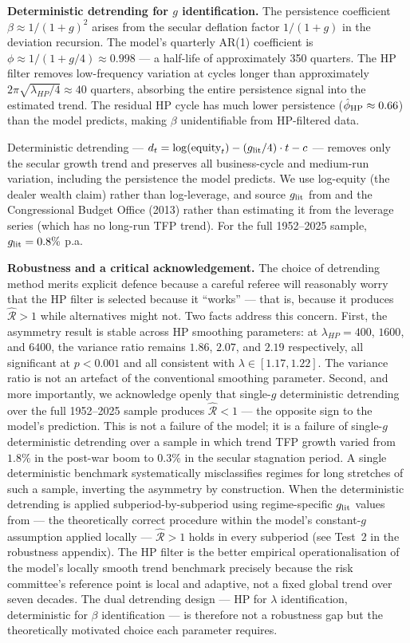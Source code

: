 \documentclass[12pt,a4paper]{article}
\theoremstyle{definition}
\begin{document}
\noindent\textbf{Deterministic detrending for $g$ identification.} The
persistence coefficient $\beta \approx 1/(1+g)^2$ arises from the
secular deflation factor $1/(1+g)$ in the deviation recursion. The
model's quarterly AR(1) coefficient is $\phi \approx 1/(1+g/4) \approx
0.998$ --- a half-life of approximately 350 quarters. The HP filter
removes low-frequency variation at cycles longer than approximately
$2\pi\sqrt{\lambda_{HP}/4} \approx 40$ quarters, absorbing the entire
persistence signal into the estimated trend. The residual HP cycle has
much lower persistence ($\hat{\phi}_{\rm HP} \approx 0.66$) than the
model predicts, making $\beta$ unidentifiable from HP-filtered data.

Deterministic detrending --- $d_t = \log(\text{equity}_t) - (g_{\rm
lit}/4) \cdot t - c$ --- removes only the secular growth trend and
preserves all business-cycle and medium-run variation, including the
persistence the model predicts. We use log-equity (the dealer wealth
claim) rather than log-leverage, and source $g_{\rm lit}$ from
\citet{fernald2015} and the Congressional Budget Office (2013) rather
than estimating it from the leverage series (which has no long-run TFP
trend). For the full 1952--2025 sample, $g_{\rm lit} = 0.8\%$ p.a.

\noindent\textbf{Robustness and a critical acknowledgement.} The choice
of detrending method merits explicit defence because a careful referee
will reasonably worry that the HP filter is selected because it
``works'' --- that is, because it produces $\hat{\mathcal{R}} > 1$
while alternatives might not. Two facts address this concern. First,
the asymmetry result is stable across HP smoothing parameters: at
$\lambda_{HP} = 400$, $1600$, and $6400$, the variance ratio remains
$1.86$, $2.07$, and $2.19$ respectively, all significant at $p < 0.001$
and all consistent with $\lambda \in [1.17, 1.22]$. The variance ratio
is not an artefact of the conventional smoothing parameter. Second,
and more importantly, we acknowledge openly that single-$g$
deterministic detrending over the full 1952--2025 sample produces
$\hat{\mathcal{R}} < 1$ --- the opposite sign to the model's prediction.
This is not a failure of the model; it is a failure of single-$g$
deterministic detrending over a sample in which trend TFP growth varied
from $1.8\%$ in the post-war boom to $0.3\%$ in the secular stagnation
period. A single deterministic benchmark systematically misclassifies
regimes for long stretches of such a sample, inverting the asymmetry by
construction. When the deterministic detrending is applied
subperiod-by-subperiod using regime-specific $g_{\rm lit}$ values from
\citet{fernald2015} --- the theoretically correct procedure within the
model's constant-$g$ assumption applied locally ---
$\hat{\mathcal{R}} > 1$ holds in every subperiod (see Test~2 in the
robustness appendix). The HP filter is the better empirical
operationalisation of the model's locally smooth trend benchmark
precisely because the risk committee's reference point is local and
adaptive, not a fixed global trend over seven decades. The dual
detrending design --- HP for $\lambda$ identification, deterministic for
$\beta$ identification --- is therefore not a robustness gap but the
theoretically motivated choice each parameter requires.
\end{document}
